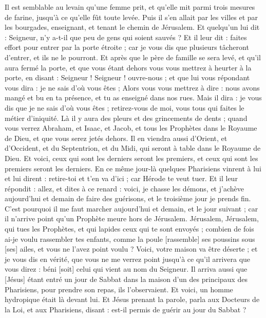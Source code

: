 \begin{multicols}{2}
Il est semblable au levain qu'une femme prit, et qu'elle mit parmi trois mesures de farine, jusqu'à ce qu'elle fût toute levée.
Puis il s'en allait par les villes et par les bourgades, enseignant, et tenant le chemin de Jérusalem.
Et quelqu'un lui dit : Seigneur, n'y a-t-il que peu de gens qui soient sauvés ?
Et il leur dit : faites effort pour entrer par la porte étroite ; car je vous dis que plusieurs tâcheront d'entrer, et ils ne le pourront.
Et après que le père de famille se sera levé, et qu'il aura fermé la porte, et que vous étant dehors vous vous mettrez à heurter à la porte, en disant : Seigneur ! Seigneur ! ouvre-nous ; et que lui vous répondant vous dira : je ne sais d'où vous êtes ;
Alors vous vous mettrez à dire : nous avons mangé et bu en ta présence, et tu as enseigné dans nos rues.
Mais il dira : je vous dis que je ne sais d'où vous êtes ; retirez-vous de moi, vous tous qui faites le métier d'iniquité.
Là il y aura des pleurs et des grincements de dents ; quand vous verrez Abraham, et Isaac, et Jacob, et tous les Prophètes dans le Royaume de Dieu, et que vous serez jetés dehors.
Il en viendra aussi d'Orient, et d'Occident, et du Septentrion, et du Midi, qui seront à table dans le Royaume de Dieu.
Et voici, ceux qui sont les derniers seront les premiers, et ceux qui sont les premiers seront les derniers.
En ce même jour-là quelques Pharisiens vinrent à lui et lui dirent : retire-toi et t'en va d'ici ; car Hérode te veut tuer.
Et il leur répondit : allez, et dites à ce renard : voici, je chasse les démons, et j'achève aujourd'hui et demain de faire des guérisons, et le troisième jour je prends fin.
C'est pourquoi il me faut marcher aujourd'hui et demain, et le jour suivant ; car il n'arrive point qu'un Prophète meure hors de Jérusalem.
Jérusalem, Jérusalem, qui tues les Prophètes, et qui lapides ceux qui te sont envoyés ; combien de fois ai-je voulu rassembler tes enfants, comme la poule [rassemble] ses poussins sous [ses] ailes, et vous ne l'avez point voulu ?
Voici, votre maison va être déserte ; et je vous dis en vérité, que vous ne me verrez point jusqu'à ce qu'il arrivera que vous direz : béni [soit] celui qui vient au nom du Seigneur.
\VerseOne{}Il arriva aussi que [Jésus] étant entré un jour de Sabbat dans la maison d'un des principaux des Pharisiens, pour prendre son repas, ils l'observaient.
Et voici, un homme hydropique était là devant lui.
Et Jésus prenant la parole, parla aux Docteurs de la Loi, et aux Pharisiens, disant : est-il permis de guérir au jour du Sabbat ?

\end{multicols}
